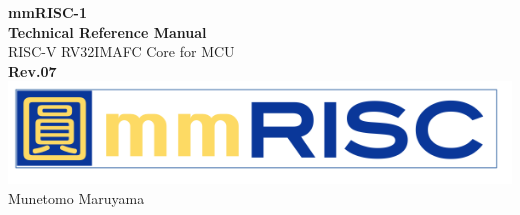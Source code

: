 \begin{titlepage}
    \begin{center}
        \vspace*{5cm}
        {\Huge \textbf{mmRISC-1}}\\[1cm]
        {\Huge \textbf{Technical Reference Manual}}\\[2cm]
        {\LARGE{RISC-V RV32IMAFC Core for MCU}}\\[3cm]
        {\LARGE \textbf{Rev.07}}\\[3cm]
        \includegraphics[width=0.75\columnwidth]{./Logo/mmRISC_Logo.png}\\[2cm]
        {\LARGE{Munetomo Maruyama}}\\[0.5cm]
    \end{center} 
\end{titlepage}

